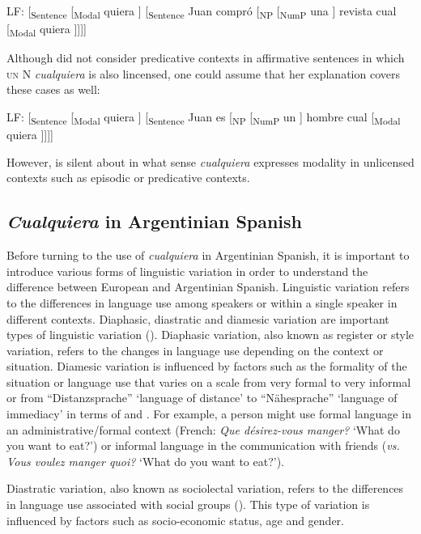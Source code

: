 \ea %
  LF: [\textsubscript{Sentence} [\textsubscript{Modal} {quiera} ] [\textsubscript{Sentence} Juan compró [\textsubscript{NP} [\textsubscript{NumP} una ] revista cual [\textsubscript{Modal} quiera ]]]]
\z

Although \citet{Rivero2011} did not consider predicative contexts in affirmative sentences in which \textsc{un} N \textit{cualquiera} is also lincensed, one could assume that her explanation covers these cases as well:

\ea %
  LF: [\textsubscript{Sentence} [\textsubscript{Modal} {quiera} ] [\textsubscript{Sentence} Juan es [\textsubscript{NP} [\textsubscript{NumP} un ] hombre cual [\textsubscript{Modal} quiera ]]]]
\z

However, \citet{Rivero2011} is silent about in what sense \textit{cualquiera} expresses modality in unlicensed contexts such as episodic or predicative contexts.

\subsection{{\textit{Cualquiera}} {in} {Argentinian} {Spanish}} \label{sec:2.1.4}

Before turning to the use of \textit{cualquiera} in Argentinian Spanish, it is important to introduce various forms of linguistic variation in order to understand the difference between European and Argentinian Spanish. Linguistic variation refers to the differences in language use among speakers or within a single speaker in different contexts. Diaphasic, diastratic and diamesic variation are important types of linguistic variation (\citealt{ferguson1994dialect, labov1972sociolinguistic, koch1990gesprochene}). Diaphasic variation, also known as register or style variation, refers to the changes in language use depending on the context or situation. Diamesic variation is influenced by factors such as the formality of the situation or language use that varies on a scale from very formal to very informal or from “Distanzsprache” ‘language of distance’ to “Nähesprache” ‘language of immediacy’ in terms of \citet{koch1990gesprochene} and \citet{koch1999}. For example, a person might use formal language in an administrative/formal context (French: \textit{Que désirez-vous manger?} ‘What do you want to eat?’) or informal language in the communication with friends (\textit{vs. Vous voulez manger quoi? } ‘What do you want to eat?’).

{Diastratic variation, also known as sociolectal variation, refers to the differences in language use associated with social groups (\cite{labov1972sociolinguistic, trudgill2000sociolinguistics}). This type of variation is influenced by factors such as socio-economic status, age and gender.} 

